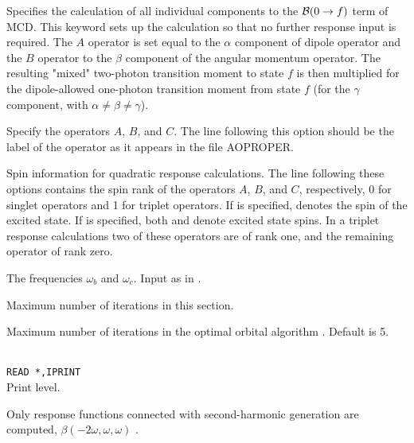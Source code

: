 \begin{description}
\item{}
Specifies the calculation of all individual components to the 
${\cal{B}}(0\to f)$ term of 
MCD.
This keyword sets up the calculation so that no further response input is required. 
The $A$ operator is set equal to the $\alpha$ component of dipole 
operator and
the $B$ operator to the $\beta$ component of the angular momentum
operator. The resulting "mixed" two-photon transition moment to state $f$ 
is then multiplied for the dipole-allowed one-photon transition moment 
from state $f$ (for the $\gamma$ component, with $\alpha \neq \beta \neq \gamma$).
\cite{Coriani:MCDRSP} 

\item[\Key{APROP}, \Key{BPROP}, \Key{CPROP}]
Specify the operators $A$, $B$, and $C$. The line following this
option should be the label of the operator as it appears in the file
AOPROPER.

\item[\Key{ASPIN}, \Key{BSPIN}, \Key{CSPIN}]
Spin information for quadratic response calculations.
The line following these options contains the spin rank of the operators 
$A$, $B$, and $C$, respectively, 0 for singlet operators and 1 for triplet
operators. If  is specified,  denotes the
spin of the excited state. If  is specified,
both  and  denote excited state spins.
In a triplet response calculations two of these operators are of rank one,
and the remaining operator of rank zero.


\item[\Key{BFREQ}, \Key{CFREQ}]
The frequencies $\omega_b$ and $\omega_c$. Input as in
.

\item{}
Maximum number of iterations in this section.

\item{}
Maximum number of iterations in the optimal orbital algorithm 
\cite{tuhjahjajpjjcp84}. 
Default is 5.

\item{}\\
\verb|READ *,IPRINT|\\
Print level.

\item{}
Only response functions connected with second-harmonic
generation 
are computed, $\beta(-2\omega,\omega,\omega)$ .


\end{description}
